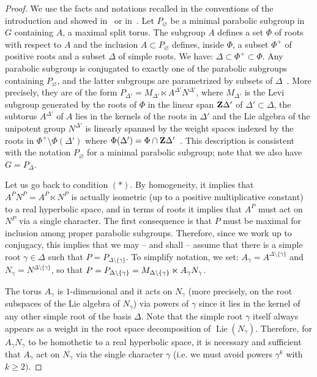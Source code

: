 \documentclass[11pt]{article}
\theoremstyle{definition}
\numberwithin{equation}{section}
\numberwithin{figure}{section}
\numberwithin{table}{section}
\DeclareMathOperator{\Lie}{Lie}
\begin{document}
\begin{proof}
We use the facts and notations recalled in the conventions of the introduction and showed in~\cite[\textsection~14]{BoTi} or in~\cite[\textsection~24.C]{Borel-LAG}. Let $P_\varnothing$ be a minimal parabolic subgroup in $G$ containing $A$, a maximal split torus. The subgroup $A$ defines a set $\Phi$ of roots with respect to $A$ and the inclusion $A \subset P_\varnothing$ defines, inside $\Phi$, a subset $\Phi^+$ of positive roots and a subset $\Delta$ of simple roots. We have: $\Delta \subset \Phi^+ \subset \Phi$. Any parabolic subgroup is conjugated to exactly one of the parabolic subgroups containing $P_\varnothing$, and the latter subgroups are parametrized by subsets of $\Delta$~\cite[21.12]{Borel-LAG}. More precisely, they are of the form $P_{\Delta'}= M_{\Delta'} \ltimes A^{\Delta'}N^{\Delta'}$, where $M_{\Delta'}$ is the Levi subgroup generated by the roots of $\Phi$ in the linear span ${\bf Z}\Delta'$ of $\Delta' \subset \Delta$, the subtorus $A^{\Delta'}$ of $A$ lies in the kernels of the roots in $\Delta'$ and the Lie algebra of the unipotent group $N^{\Delta'}$ is linearly spanned by the weight spaces indexed by the roots in $\Phi^+ \setminus \Phi(\Delta')$ where $\Phi(\Delta') = \Phi \cap {\bf Z}\Delta'$~\cite[21.11]{Borel-LAG}. This description is consistent with the notation $P_\varnothing$ for a minimal parabolic subgroup; note that we also have $G=P_\Delta$.

Let us go back to condition $(*)$. By homogeneity, it implies that $A^PN^P = A^P \ltimes N^P$ is actually isometric (up to a positive multiplicative constant) to a real hyperbolic space, and in terms of roots it implies that $A^P$ must act on $N^P$ via a single character. The first consequence is that $P$ must be maximal for inclusion among proper parabolic subgroups. Therefore, since we work up to conjugacy, this implies that we may -- and shall -- assume that there is a simple root $\gamma \in \Delta$ such that $P = P_{\Delta \setminus \{\gamma \}}$. To simplify notation, we set: $A_\gamma = A^{\Delta \setminus \{\gamma \}}$ and $N_\gamma = N^{\Delta \setminus \{\gamma \}}$, so that $P = P_{\Delta \setminus \{\gamma \}}\linebreak = M_{\Delta \setminus \{\gamma \}} \ltimes A_\gamma N_\gamma$.

The torus $A_\gamma$ is $1$-dimensional and it acts on $N_\gamma$ (more precisely, on the root subspaces of the Lie algebra of $N_\gamma$) via powers of $\gamma$ since it lies in the kernel of any other simple root of the basis $\Delta$. Note that the simple root $\gamma$ itself always appears as a weight in the root space decomposition of $\Lie(N_\gamma)$. Therefore, for $A_\gamma N_\gamma$ to be homothetic to a real hyperbolic space, it is necessary and sufficient that $A_\gamma$ act on $N_\gamma$ via the single character $\gamma$ (i.e. we must avoid powers $\gamma^k$ with $k \geqslant 2)$.


\end{proof}
\end{document}
